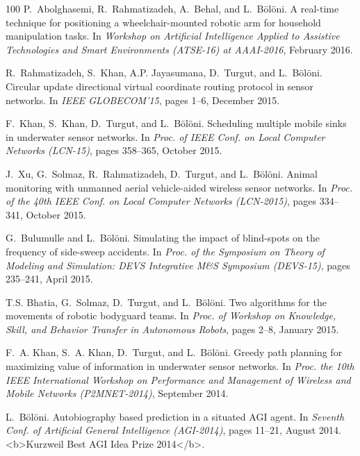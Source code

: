 \begin{thebibliography}{100}
P.~Abolghasemi, R.~Rahmatizadeh, A.~Behal, and L.~Bölöni.
\newblock A real-time technique for positioning a wheelchair-mounted robotic
  arm for household manipulation tasks.
\newblock In {\em Workshop on Artificial Intelligence Applied to Assistive
  Technologies and Smart Environments (ATSE-16) at AAAI-2016}, February 2016.

R.~Rahmatizadeh, S.~Khan, A.P. Jayasumana, D.~Turgut, and L.~Bölöni.
\newblock Circular update directional virtual coordinate routing protocol in
  sensor networks.
\newblock In {\em IEEE GLOBECOM'15}, pages 1--6, December 2015.

F.~Khan, S.~Khan, D.~Turgut, and L.~Bölöni.
\newblock Scheduling multiple mobile sinks in underwater sensor networks.
\newblock In {\em Proc. of IEEE Conf. on Local Computer Networks (LCN-15)},
  pages 358--365, October 2015.

J.~Xu, G.~Solmaz, R.~Rahmatizadeh, D.~Turgut, and L.~Bölöni.
\newblock Animal monitoring with unmanned aerial vehicle-aided wireless sensor
  networks.
\newblock In {\em Proc. of the 40th IEEE Conf. on Local Computer Networks
  (LCN-2015)}, pages 334--341, October 2015.

G.~Bulumulle and L.~Bölöni.
\newblock Simulating the impact of blind-spots on the frequency of side-sweep
  accidents.
\newblock In {\em Proc. of the Symposium on Theory of Modeling and Simulation:
  DEVS Integrative M\&S Symposium (DEVS-15)}, pages 235--241, April 2015.

T.S. Bhatia, G.~Solmaz, D.~Turgut, and L.~Bölöni.
\newblock Two algorithms for the movements of robotic bodyguard teams.
\newblock In {\em Proc. of Workshop on Knowledge, Skill, and Behavior Transfer
  in Autonomous Robots}, pages 2--8, January 2015.

F.~A. Khan, S.~A. Khan, D.~Turgut, and L.~Bölöni.
\newblock Greedy path planning for maximizing value of information in
  underwater sensor networks.
\newblock In {\em Proc. the 10th IEEE International Workshop on Performance and
  Management of Wireless and Mobile Networks (P2MNET-2014)}, September 2014.

L.~Bölöni.
\newblock Autobiography based prediction in a situated {AGI} agent.
\newblock In {\em Seventh Conf. of Artificial General Intelligence (AGI-2014)},
  pages 11--21, August 2014.
\newblock <b>Kurzweil Best AGI Idea Prize 2014</b>.


\end{thebibliography}
